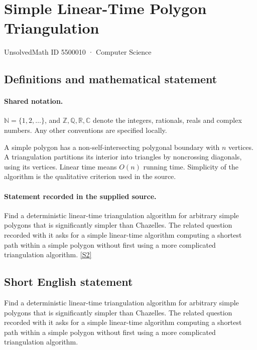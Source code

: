 \documentclass[11pt]{article}
\newcommand{\sref}[2]{\hyperlink{source:#1:#2}{[S#2]}}
\begin{document}
\setcounter{section}{5500009}
\section{Simple Linear-Time Polygon Triangulation}\label{5500010}
{\small\sffamily UnsolvedMath ID 5500010 · Computer Science}
\subsection{Definitions and mathematical statement}

\paragraph{Shared notation.}$\mathbb N=\{1,2,\ldots\}$, and $\mathbb Z,\mathbb Q,\mathbb R,\mathbb C$ denote the integers, rationals, reals and complex numbers. Any other conventions are specified locally.


A simple polygon has a non-self-intersecting polygonal boundary with $n$ vertices. A triangulation partitions its interior into triangles by noncrossing diagonals, using its vertices. Linear time means $O(n)$ running time. Simplicity of the algorithm is the qualitative criterion used in the source.
\paragraph{Statement recorded in the supplied source.}
Find a deterministic linear-time triangulation algorithm for arbitrary simple polygons that is significantly simpler than Chazelle\textquotesingle s. The related question recorded with it asks for a simple linear-time algorithm computing a shortest path within a simple polygon without first using a more complicated triangulation algorithm. \sref{5500010}{2}
\subsection{Short English statement}
Find a deterministic linear-time triangulation algorithm for arbitrary simple polygons that is significantly simpler than Chazelle\textquotesingle s. The related question recorded with it asks for a simple linear-time algorithm computing a shortest path within a simple polygon without first using a more complicated triangulation algorithm.
\end{document}
